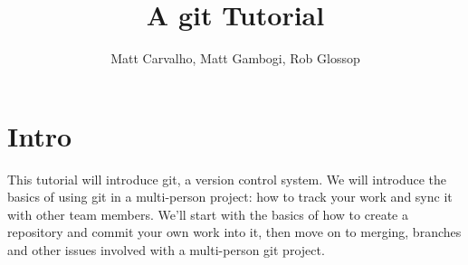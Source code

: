 \documentclass[11pt]{report}
\title{A git Tutorial}
\author{Matt Carvalho, Matt Gambogi, Rob Glossop}
\begin{document}
\thispagestyle{empty}
\maketitle

\clearpage {} 

\tableofcontents

\listoffigures

\clearpage {}
\section{Intro}

This tutorial will introduce git, a version control system. We will
introduce the basics of using git in a multi-person project: how to
track your work and sync it with other team members. We'll start with
the basics of how to create a repository and commit your own work into
it, then move on to merging, branches and other issues involved with a
multi-person git project.
\end{document}
